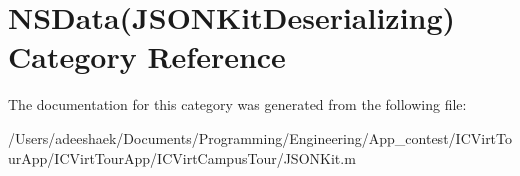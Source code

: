 \hypertarget{category_n_s_data_07_j_s_o_n_kit_deserializing_08}{\section{N\-S\-Data(J\-S\-O\-N\-Kit\-Deserializing) Category Reference}
\label{category_n_s_data_07_j_s_o_n_kit_deserializing_08}
}


The documentation for this category was generated from the following file\-:\begin{DoxyCompactItemize}
\item 
/\-Users/adeeshaek/\-Documents/\-Programming/\-Engineering/\-App\-\_\-contest/\-I\-C\-Virt\-Tour\-App/\-I\-C\-Virt\-Tour\-App/\-I\-C\-Virt\-Campus\-Tour/J\-S\-O\-N\-Kit.\-m\end{DoxyCompactItemize}
